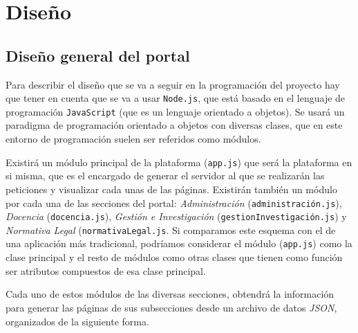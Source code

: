 \chapter{Diseño}

\section{Diseño general del portal}

Para describir el diseño que se va a seguir en la programación del proyecto hay que tener en cuenta que se va a usar {\tt Node.js}, que está basado en el lenguaje de programación {\tt JavaScript} (que es un lenguaje orientado a objetos). Se usará un paradigma de programación orientado a objetos con diversas clases, que en este entorno de programación suelen ser referidos como módulos.

\bigskip
Existirá un módulo principal de la plataforma ({\tt app.js}) que será la plataforma en si misma, que es el encargado de generar el servidor al que se realizarán las peticiones y visualizar cada unas de las páginas. Existirán también un módulo por cada una de las secciones del portal: \textit{Administración} ({\tt administración.js}), \textit{Docencia} ({\tt docencia.js}), \textit{Gestión e Investigación} ({\tt gestionInvestigación.js}) y \textit{Normativa Legal} ({\tt normativaLegal.js}. Si comparamos este esquema con el de una aplicación más tradicional, podríamos considerar el módulo ({\tt app.js}) como la clase principal y el resto de módulos como otras clases que tienen como función ser atributos compuestos de esa clase principal.

\bigskip
Cada uno de estos módulos de las diversas secciones, obtendrá la información para generar las páginas de sus subsecciones desde un archivo de datos \textit{JSON}, organizados de la siguiente forma.

